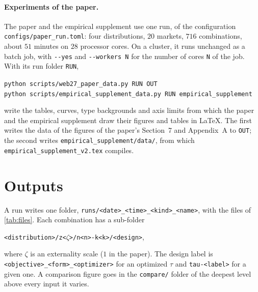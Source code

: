 \documentclass[11pt]{article}
\newcommand{\code}[1]{\texttt{#1}}
\begin{document}
\paragraph{Experiments of the paper.} The paper and the empirical supplement use one run, of the configuration \code{configs/\allowbreak paper\_run.toml}: four distributions, $20$ markets, $716$ combinations, about $51$ minutes on $28$ processor cores. On a cluster, it runs unchanged as a batch job, with \code{-{}-yes} and \code{-{}-workers N} for the number of cores \code{N} of the job. With its run folder \code{RUN},
\begin{center}
\code{python scripts/web27\_paper\_data.py RUN OUT}\\
\code{python scripts/empirical\_supplement\_data.py RUN empirical\_supplement}
\end{center}
write the tables, curves, type backgrounds and axis limits from which the paper and the empirical supplement draw their figures and tables in \LaTeX. The first writes the data of the figures of the paper's Section~7 and Appendix~A to \code{OUT}; the second writes \code{empirical\_supplement/data/}, from which \code{empirical\_supplement\_v2.tex} compiles.

\section{Outputs}\label{sec:outputs}

A run writes one folder, \code{runs/<date>\_<time>\_<kind>\_<name>}, with the files of \cref{tab:files}. Each combination has a sub-folder
\begin{center}
\code{<distribution>/z<$\zeta$>/n<n>-k<k>/<design>},
\end{center}
where $\zeta$ is an externality scale ($1$ in the paper). The design label is \code{<objective>\_\allowbreak<form>\_\allowbreak<optimizer>} for an optimized $\tau$ and \code{tau-<label>} for a given one. A comparison figure goes in the \code{compare/} folder of the deepest level above every input it varies.
\end{document}
